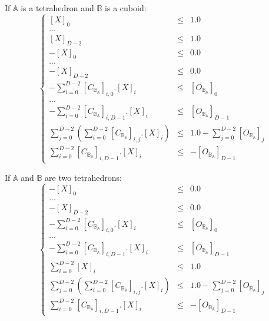 \documentclass[12pt, a4paper]{article}
\begin{document}
If $\mathbb{A}$ is a tetrahedron and $\mathbb{B}$ is a cuboid:
\begin{equation}
\left\lbrace
\begin{array}{rcl}
\left[X\right]_0&\le&1.0\\
...\\
\left[X\right]_{D-2}&\le&1.0\\
-\left[X\right]_0&\le&0.0\\
...\\
-\left[X\right]_{D-2}&\le&0.0\\
-\sum_{i=0}^{D-2}\left[C_{\mathbb{B}_\mathbb{A}}\right]_{i,0}.\left[X\right]_i&\le&\left[O_{\mathbb{B}_\mathbb{A}}\right]_0\\
...\\
-\sum_{i=0}^{D-2}\left[C_{\mathbb{B}_\mathbb{A}}\right]_{i,D-1}.\left[X\right]_i&\le&\left[O_{\mathbb{B}_\mathbb{A}}\right]_{D-1}\\
\sum_{j=0}^{D-2}\left(\sum_{i=0}^{D-2}\left[C_{\mathbb{B}_\mathbb{A}}\right]_{i,j}.\left[X\right]_i\right)&\le&1.0-\sum_{j=0}^{D-2}\left[O_{\mathbb{B}_\mathbb{A}}\right]_j\\
\sum_{i=0}^{D-2}\left[C_{\mathbb{B}_\mathbb{A}}\right]_{i,D-1}.\left[X\right]_i&\le&-\left[O_{\mathbb{B}_\mathbb{A}}\right]_{D-1}
\end{array}
\right.
\end{equation}

If $\mathbb{A}$ and $\mathbb{B}$ are two tetrahedrons:
\begin{equation}
\left\lbrace
\begin{array}{rcl}
-\left[X\right]_0&\le&0.0\\
...\\
-\left[X\right]_{D-2}&\le&0.0\\
-\sum_{i=0}^{D-2}\left[C_{\mathbb{B}_\mathbb{A}}\right]_{i,0}.\left[X\right]_i&\le&\left[O_{\mathbb{B}_\mathbb{A}}\right]_0\\
...\\
-\sum_{i=0}^{D-2}\left[C_{\mathbb{B}_\mathbb{A}}\right]_{i,D-1}.\left[X\right]_i&\le&\left[O_{\mathbb{B}_\mathbb{A}}\right]_{D-1}\\
\sum_{i=0}^{D-2}\left[X\right]_i&\le&1.0\\
\sum_{j=0}^{D-2}\left(\sum_{i=0}^{D-2}\left[C_{\mathbb{B}_\mathbb{A}}\right]_{i,j}.\left[X\right]_i\right)&\le&1.0-\sum_{j=0}^{D-2}\left[O_{\mathbb{B}_\mathbb{A}}\right]_j\\
\sum_{i=0}^{D-2}\left[C_{\mathbb{B}_\mathbb{A}}\right]_{i,D-1}.\left[X\right]_i&\le&-\left[O_{\mathbb{B}_\mathbb{A}}\right]_{D-1}
\end{array}
\right.
\end{equation}
\end{document}
